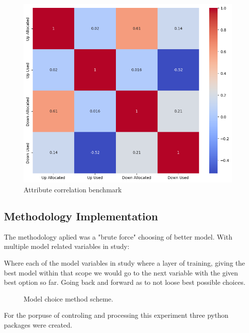 \begin{figure}[H]
    \centering
    \includegraphics[width=\textwidth]{plots/correlation_heatmap_benchmark.png}
    \caption{Attribute correlation benchmark}
    \label{fig:Attribute_correlation_benchmark}
  \end{figure}
  
  


\subsection{Methodology Implementation}

The methodology aplied was a "brute force" choosing of better model. With multiple model related variables in study:\par



Where each of the model variables in study where a layer of training, giving the best model within that scope we would go to the next variable with the given best option so far. Going back and forward as to not loose best possible choices.\par


\begin{figure}[H]
	\centering
	\resizebox{\linewidth}{!}{}
	\caption{Model choice method scheme.}
	\label{fig:method_training}
\end{figure}

For the porpuse of controling and processing this experiment three python packages were created.

